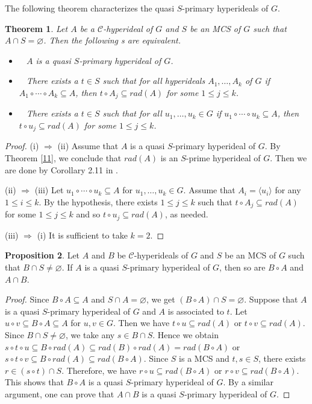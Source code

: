 \documentclass[preprint,review,10pt]{amsart}
\newtheorem{theorem}{Theorem}[section]
\theoremstyle{definition}
\newtheorem{proposition}[theorem]{Proposition}
\theoremstyle{remark}
\numberwithin{equation}{section}
\begin{document}
The following theorem characterizes the  quasi $S$-primary hyperideals of $G$.
\begin{theorem} \label{12}
Let $A$ be a   $\mathcal{C}$-hyperideal of $G$ and $S$ be an MCS of $G$ such that $A \cap S=\varnothing$. Then the following s are equivalent.

\begin{itemize}
\item[\rm{(i)}]~ $A$ is a quasi $S$-primary hyperideal of $G$.
\item[\rm{(ii)}]~ There exists a  $t \in S$ such that for all hyperideals $A_1,\ldots,A_k$ of $ G$ if $A_1 \circ \cdots\circ A_k \subseteq A$, then $t \circ A_j \subseteq rad(A)$ for some $1 \leq j \leq k$. 
\item[\rm{(iii)}]~ There exists a  $t \in S$ such that for all   $u_1,\ldots,u_k \in G$ if $u_1 \circ \cdots\circ u_k \subseteq A$, then $t \circ u_j \subseteq rad(A)$ for some $1 \leq j \leq k$. 
\end{itemize}
\end{theorem}
\begin{proof}
(i) $\Longrightarrow$ (ii) Assume that $A$ is a quasi $S$-primary hyperideal of $G$. By Theorem \ref{11}, we conclude that $rad(A)$ is an $S$-prime hyperideal of $G$. Then we are done by Corollary 2.11 in \cite{Ghiasvand}.

(ii) $\Longrightarrow$ (iii) Let $u_1 \circ \cdots\circ u_k \subseteq A$ for $u_1,\ldots,u_k \in G$. Assume that $A_i=\langle u_i \rangle$ for any $1 \leq i \leq k$. By the hypothesis, there exists $1 \leq j \leq k$ such that $ t \circ A_j \subseteq rad(A)$ for some $1 \leq j \leq k$ and so $t \circ u_j \subseteq rad(A)$, as needed.

(iii) $\Longrightarrow$ (i) It is sufficient to take $k=2$.
\end{proof}
\begin{proposition}
Let $A$ and $B$ be     $\mathcal{C}$-hyperideals of $G$ and $S$ be an MCS of $G$ such that $B \cap S \neq \varnothing$. If $A$ is a quasi $S$-primary hyperideal of $G$, then so are $B \circ A$ and $A \cap B$.
\end{proposition}
\begin{proof}
Since $B \circ A \subseteq  A$ and $S \cap A = \varnothing$, we get $(B \circ A) \cap S = \varnothing$. Suppose that $A$ is a quasi $S$-primary hyperideal of $G$ and $A$ is associated to $t$.    Let $u \circ v \subseteq B \circ A \subseteq A$ for $u,v \in G$. Then we have $t \circ u \subseteq rad(A)$ or $t \circ v \subseteq rad(A)$. Since $B \cap S \neq \varnothing$, we take any $s \in B \cap S$. Hence we obtain  $s \circ t \circ u \subseteq B \circ rad(A) \subseteq rad(B) \circ rad(A)=rad(B \circ A)$ or $s \circ t \circ v \subseteq B \circ rad(A) \subseteq rad(B \circ A)$. Since $S$ is a MCS and $t,s \in S$, there exists $r \in (s \circ t) \cap S$. Therefore, we have $r \circ u  \subseteq rad(B \circ A)$ or $r \circ v  \subseteq rad(B \circ A)$. This shows that $B \circ A$ is a quasi $S$-primary hyperideal of $G$. By a similar argument, one can prove that $A \cap B$ is a quasi $S$-primary hyperideal of $G$.
\end{proof}
\end{document}
